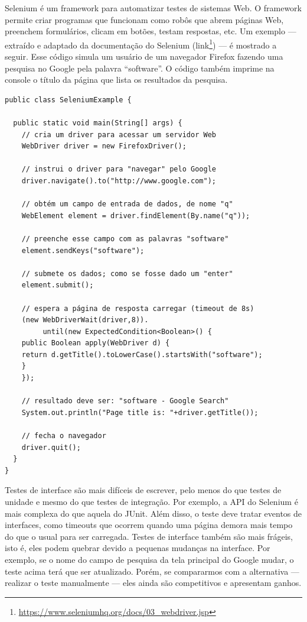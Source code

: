 \documentclass[
  11pt,
  twoside]{book}
\DeclareRobustCommand{\href}[2]{#2\footnote{\url{#1}}}
\begin{document}
 

Selenium é um framework para automatizar testes de sistemas Web. O
framework permite criar programas que funcionam como robôs que abrem
páginas Web, preenchem formulários, clicam em botões, testam respostas,
etc. Um exemplo --- extraído e adaptado da documentação do Selenium
(\href{https://www.seleniumhq.org/docs/03_webdriver.jsp}{link}) --- é
mostrado a seguir. Esse código simula um usuário de um navegador Firefox
fazendo uma pesquisa no Google pela palavra ``software''. O código
também imprime na console o título da página que lista os resultados da
pesquisa.

\begin{lstlisting}
public class SeleniumExample {

  public static void main(String[] args) {
    // cria um driver para acessar um servidor Web
    WebDriver driver = new FirefoxDriver();

    // instrui o driver para "navegar" pelo Google
    driver.navigate().to("http://www.google.com");

    // obtém um campo de entrada de dados, de nome "q"
    WebElement element = driver.findElement(By.name("q"));

    // preenche esse campo com as palavras "software"
    element.sendKeys("software");

    // submete os dados; como se fosse dado um "enter"
    element.submit();

    // espera a página de resposta carregar (timeout de 8s)
    (new WebDriverWait(driver,8)).
         until(new ExpectedCondition<Boolean>() {
    public Boolean apply(WebDriver d) {
    return d.getTitle().toLowerCase().startsWith("software");
    }
    });

    // resultado deve ser: "software - Google Search"
    System.out.println("Page title is: "+driver.getTitle());

    // fecha o navegador
    driver.quit();
  }
}
\end{lstlisting}

Testes de interface são mais difíceis de escrever, pelo menos do que
testes de unidade e mesmo do que testes de integração. Por exemplo, a
API do Selenium é mais complexa do que aquela do JUnit. Além disso, o
teste deve tratar eventos de interfaces, como timeouts que ocorrem
quando uma página demora mais tempo do que o usual para ser carregada.
Testes de interface também são mais frágeis, isto é, eles podem quebrar
devido a pequenas mudanças na interface. Por exemplo, se o nome do campo
de pesquisa da tela principal do Google mudar, o teste acima terá que
ser atualizado. Porém, se compararmos com a alternativa --- realizar o
teste manualmente --- eles ainda são competitivos e apresentam ganhos.
\end{document}
